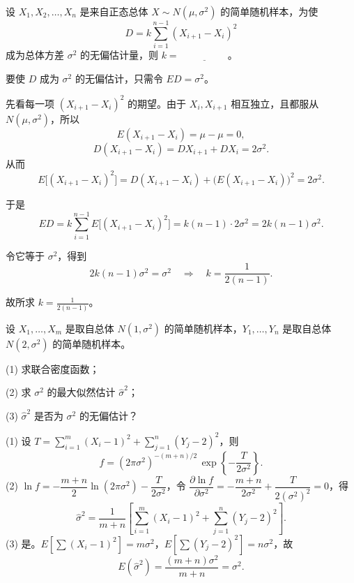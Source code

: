 ﻿\documentclass[lang=cn,11pt]{elegantbook}
\begin{document}
\begin{exercise}\label{exer:7-unbiased-diff}
设 \(X_1, X_2, \dots, X_n\) 是来自正态总体 \(X \sim N(\mu, \sigma^2)\) 的简单随机样本，为使
\[
D = k\sum_{i=1}^{n-1}(X_{i+1}-X_i)^2
\]
成为总体方差 \(\sigma^2\) 的无偏估计量，则 \(k =\,\underline{\hspace{2cm}}\)。
\end{exercise}
\begin{solution}
要使 \(D\) 成为 \(\sigma^2\) 的无偏估计，只需令 \(ED=\sigma^2\)。

先看每一项 \((X_{i+1}-X_i)^2\) 的期望。由于 \(X_i,X_{i+1}\) 相互独立，且都服从 \(N(\mu,\sigma^2)\)，所以
\[
E(X_{i+1}-X_i)=\mu-\mu=0,
\]
\[
D(X_{i+1}-X_i)=DX_{i+1}+DX_i=2\sigma^2.
\]
从而
\[
E\bigl[(X_{i+1}-X_i)^2\bigr]
=D(X_{i+1}-X_i)+\bigl(E(X_{i+1}-X_i)\bigr)^2
=2\sigma^2.
\]

于是
\[
ED
=k\sum_{i=1}^{n-1}E\bigl[(X_{i+1}-X_i)^2\bigr]
=k(n-1)\cdot 2\sigma^2
=2k(n-1)\sigma^2.
\]

令它等于 \(\sigma^2\)，得到
\[
2k(n-1)\sigma^2=\sigma^2 \quad\Longrightarrow\quad k=\frac{1}{2(n-1)}.
\]

故所求 \(k=\frac{1}{2(n-1)}\)。
\end{solution}




\begin{exercise}\label{exer:7-two-normal-mle}
设 \(X_1, \dots, X_m\) 是取自总体 \(N(1, \sigma^2)\) 的简单随机样本，\(Y_1, \dots, Y_n\) 是取自总体 \(N(2, \sigma^2)\) 的简单随机样本。\par
(1) 求联合密度函数；\par
(2) 求 \(\sigma^2\) 的最大似然估计 \(\hat{\sigma}^2\)；\par
(3) \(\hat{\sigma}^2\) 是否为 \(\sigma^2\) 的无偏估计？
\end{exercise}
\begin{solution}
(1) 设 \(T = \displaystyle\sum_{i=1}^{m}(X_i-1)^2 + \sum_{j=1}^{n}(Y_j-2)^2\)，则
\[
f = (2\pi\sigma^2)^{-(m+n)/2}\,\exp\!\left\{-\frac{T}{2\sigma^2}\right\}.
\]
(2) \(\ln f = -\dfrac{m+n}{2}\ln(2\pi\sigma^2) - \dfrac{T}{2\sigma^2}\)，令 \(\dfrac{\partial\ln f}{\partial\sigma^2} = -\dfrac{m+n}{2\sigma^2}+\dfrac{T}{2(\sigma^2)^2}=0\)，得
\[
\hat{\sigma}^2 = \frac{1}{m+n}\!\left[\sum_{i=1}^{m}(X_i-1)^2+\sum_{j=1}^{n}(Y_j-2)^2\right].
\]
(3) 是。\(E\!\left[\sum(X_i-1)^2\right] = m\sigma^2\)，\(E\!\left[\sum(Y_j-2)^2\right] = n\sigma^2\)，故
\[
E(\hat{\sigma}^2) = \frac{(m+n)\sigma^2}{m+n} = \sigma^2. 
\]
\end{solution}
\end{document}

